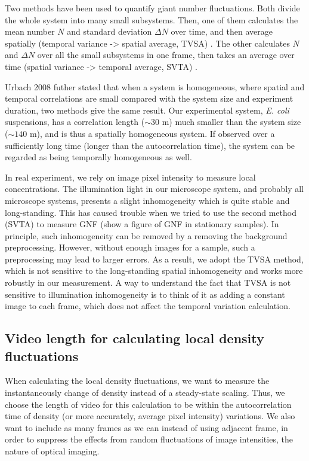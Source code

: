 \documentclass[preprint,aps,prl,amsmath,amssymb,longbibliography]{revtex4-2}
\begin{document}
Two methods have been used to quantify giant number fluctuations. Both divide the whole system into many small subsystems. Then, one of them calculates the mean number $N$ and standard deviation $\Delta N$ over time, and then average spatially (temporal variance -> spatial average, TVSA) \cite{Narayan2007}. The other calculates $N$ and $\Delta N$ over all the small subsystems in one frame, then takes an average over time (spatial variance -> temporal average, SVTA) \cite{Aranson2008}.

Urbach 2008 futher stated that when a system is homogeneous, where spatial and temporal correlations are small compared with the system size and experiment duration, two methods give the same result. Our experimental system, \textit{E. coli} suspensions, has a correlation length ($\sim 30$ \textmu m) much smaller than the system size ($\sim 140$ \textmu m), and is thus a spatially homogeneous system. If observed over a sufficiently long time (longer than the autocorrelation time), the system can be regarded as being temporally homogeneous as well.

In real experiment, we rely on image pixel intensity to measure local concentrations. The illumination light in our microscope system, and probably all microscope systems, presents a slight inhomogeneity which is quite stable and long-standing. This has caused trouble when we tried to use the second method (SVTA) to measure GNF (show a figure of GNF in stationary samples). In principle, such inhomogeneity can be removed by a removing the background preprocessing. However, without enough images for a sample, such a preprocessing may lead to larger errors. As a result, we adopt the TVSA method, which is not sensitive to the long-standing spatial inhomogeneity and works more robustly in our measurement. A way to understand the fact that TVSA is not sensitive to illumination inhomogeneity is to think of it as adding a constant image to each frame, which does not affect the temporal variation calculation.

\subsection{Video length for calculating local density fluctuations}
When calculating the local density fluctuations, we want to measure the instantaneously change of density instead of a steady-state scaling. Thus, we choose the length of video for this calculation to be within the autocorrelation time of density (or more accurately, average pixel intensity) variations. We also want to include as many frames as we can instead of using adjacent frame, in order to suppress the effects from random fluctuations of image intensities, the nature of optical imaging.
\end{document}
